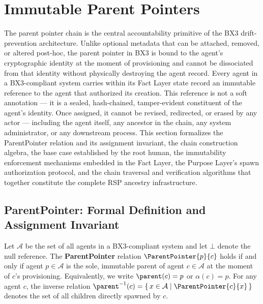 \section{Immutable Parent Pointers}
\label{sec:immutable_parent_pointers}

The parent pointer chain is the central accountability primitive of the BX3 drift-prevention architecture. Unlike optional metadata that can be attached, removed, or altered post-hoc, the parent pointer in BX3 is bound to the agent's cryptographic identity at the moment of provisioning and cannot be dissociated from that identity without physically destroying the agent record. Every agent in a BX3-compliant system carries within its Fact Layer state record an immutable reference to the agent that authorized its creation. This reference is not a soft annotation — it is a sealed, hash-chained, tamper-evident constituent of the agent's identity. Once assigned, it cannot be revised, redirected, or erased by any actor — including the agent itself, any ancestor in the chain, any system administrator, or any downstream process. This section formalizes the ParentPointer relation and its assignment invariant, the chain construction algebra, the base case established by the root human, the immutability enforcement mechanisms embedded in the Fact Layer, the Purpose Layer's spawn authorization protocol, and the chain traversal and verification algorithms that together constitute the complete RSP ancestry infrastructure.

\subsection{ParentPointer: Formal Definition and Assignment Invariant}
\label{sec:pp_definition}

\begin{definition}[ParentPointer]
\label{def:parent_pointer}
Let $\mathcal{A}$ be the set of all agents in a BX3-compliant system and let $\bot$ denote the null reference. The \textbf{ParentPointer} relation $\ParentPointer{p}{c}$ holds if and only if agent $p \in \mathcal{A}$ is the sole, immutable parent of agent $c \in \mathcal{A}$ at the moment of $c$'s provisioning. Equivalently, we write $\parent(c) = p$ or $\alpha(c) = p$. For any agent $c$, the inverse relation $\parent^{-1}(c) = \{\, x \in \mathcal{A} \mid \ParentPointer{c}{x} \,\}$ denotes the set of all children directly spawned by $c$.
\end{definition}

